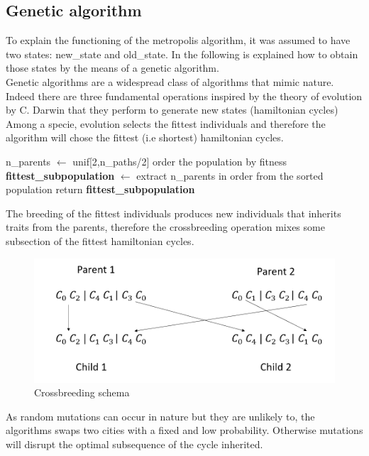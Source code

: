 \documentclass{article}
\begin{document}
\subsection{Genetic algorithm}
To explain the functioning of the metropolis algorithm, it was assumed to have two states: new\_state and old\_state. In the following is explained how to obtain those states by the means of a genetic algorithm.\\
Genetic algorithms are a widespread class of algorithms that mimic nature. Indeed there are three fundamental operations  inspired by the theory of evolution by C. Darwin that they perform to generate new states (hamiltonian cycles) \\
Among a specie, evolution selects the fittest individuals and therefore the algorithm will chose the fittest (i.e shortest) hamiltonian cycles. \\
\begin{algorithm}[H]
    \begin{algorithmic}[1]
        \State n\_parents $\leftarrow$ unif[2,n\_paths/2]
        \State order the population by fitness
        \State \textbf{fittest\_subpopulation} $\leftarrow$ extract n\_parents in order from the sorted population
        \State return \textbf{fittest\_subpopulation}
       \EndFunction
\end{algorithmic}
\end{algorithm}
\noindent The breeding of the fittest individuals produces new individuals that inherits traits from the parents, therefore the crossbreeding operation mixes some subsection of the fittest hamiltonian cycles. \\
\begin{figure}[H]\includegraphics[scale=0.5]{crossbreeding.png} 
\centering
\caption{Crossbreeding schema}
\end{figure}

\noindent As random mutations can occur in nature but they are unlikely to, the algorithms swaps two cities with a fixed and low probability. Otherwise mutations will disrupt the optimal subsequence of the cycle inherited. \\
\end{document}
